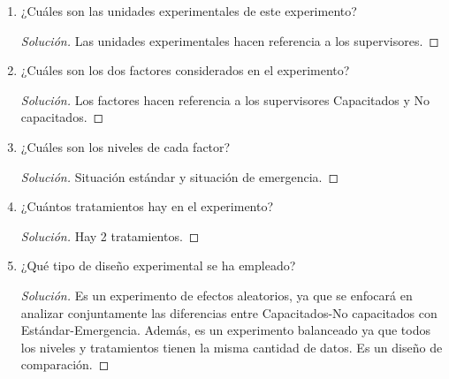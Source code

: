 \documentclass[a4paper,12pt]{article}
\newenvironment{solution}
  {\renewcommand\qedsymbol{$\blacksquare$}\begin{proof}[Solución]}
  {\end{proof}}
\begin{document}
\begin{enumerate}
    
\item ¿Cuáles son las unidades experimentales de este experimento?
\begin{solution}
Las unidades experimentales hacen referencia a los supervisores. 
\end{solution}
\item  ¿Cuáles son los dos factores considerados en el experimento?
\begin{solution}
Los factores hacen referencia a los supervisores Capacitados y No capacitados.
\end{solution}
\item ¿Cuáles son los niveles de cada factor?
\begin{solution}
Situación estándar y situación de emergencia.
\end{solution}
\item ¿Cuántos tratamientos hay en el experimento?\begin{solution}
Hay 2 tratamientos. 
\end{solution}
\item ¿Qué tipo de diseño experimental se ha empleado?
\begin{solution}
Es un experimento de efectos aleatorios, ya que se enfocará en analizar conjuntamente las diferencias entre Capacitados-No capacitados con Estándar-Emergencia. Además, es un experimento balanceado ya que todos los niveles y tratamientos tienen la misma cantidad de datos. Es un diseño de comparación.
\end{solution}


\end{enumerate}
\end{document}
